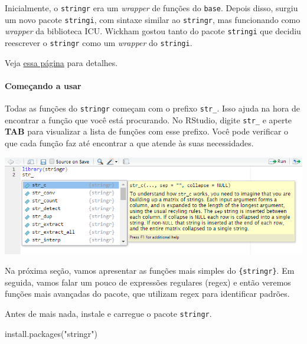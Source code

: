 \documentclass[
]{book}
\newenvironment{Shaded}{\begin{snugshade}}{\end{snugshade}}
\newcommand{\FunctionTok}[1]{\textcolor[rgb]{0.00,0.00,0.00}{#1}}
\newcommand{\NormalTok}[1]{#1}
\newcommand{\StringTok}[1]{\textcolor[rgb]{0.31,0.60,0.02}{#1}}
\begin{document}
Inicialmente, o \texttt{stringr} era um \emph{wrapper} de funções do \texttt{base}. Depois disso, surgiu um novo pacote \texttt{stringi}, com sintaxe similar ao \texttt{stringr}, mas funcionando como \emph{wrapper} da biblioteca ICU. Wickham gostou tanto do pacote \texttt{stringi} que decidiu reescrever o \texttt{stringr} como um \emph{wrapper} do \texttt{stringi}.

Veja \href{https://github.com/tidyverse/stringr/blob/master/NEWS.md}{essa página} para detalhes.

\hypertarget{comeuxe7ando-a-usar}{%
\paragraph*{Começando a usar}\label{comeuxe7ando-a-usar}}

Todas as funções do \texttt{stringr} começam com o prefixo \texttt{str\_}. Isso ajuda na hora de encontrar a função que você está procurando. No RStudio, digite \texttt{str\_} e aperte \textbf{TAB} para visualizar a lista de funções com esse prefixo. Você pode verificar o que cada função faz até encontrar a que atende às suas necessidades.

\begin{center}\includegraphics[width=9.99in]{assets/img/manipulacao/str_tab} \end{center}

Na próxima seção, vamos apresentar as funções mais simples do \texttt{\{stringr\}}. Em seguida, vamos falar um pouco de expressões regulares (regex) e então veremos funções mais avançadas do pacote, que utilizam regex para identificar padrões.

Antes de mais nada, instale e carregue o pacote \texttt{stringr}.

\begin{Shaded}
\begin{Highlighting}[]
\FunctionTok{install.packages}\NormalTok{(}\StringTok{"stringr"}\NormalTok{)}
\end{Highlighting}
\end{Shaded}
\end{document}
